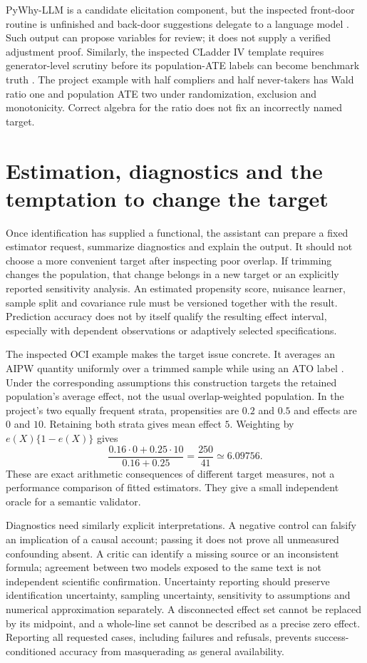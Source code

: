 PyWhy-LLM is a candidate elicitation component, but the inspected front-door
routine is unfinished and back-door suggestions delegate to a language model
\cite{v12_la_package_pywhy_llm}. Such output can propose variables for review; it
does not supply a verified adjustment proof. Similarly, the inspected CLadder
IV template requires generator-level scrutiny before its population-ATE labels
can become benchmark truth \cite{v12_la_package_cladder}. The project example
with half compliers and half never-takers has Wald ratio one and population ATE
two under randomization, exclusion and monotonicity. Correct algebra for the
ratio does not fix an incorrectly named target.

\section{Estimation, diagnostics and the temptation to change the target}

Once identification has supplied a functional, the assistant can prepare a fixed
estimator request, summarize diagnostics and explain the output. It should not
choose a more convenient target after inspecting poor overlap. If trimming
changes the population, that change belongs in a new target or an explicitly
reported sensitivity analysis. An estimated propensity score, nuisance learner,
sample split and covariance rule must be versioned together with the result.
Prediction accuracy does not by itself qualify the resulting effect interval,
especially with dependent observations or adaptively selected specifications.

The inspected OCI example makes the target issue concrete. It averages an AIPW
quantity uniformly over a trimmed sample while using an ATO label
\cite{v12_la_package_oci_agent}. Under the corresponding assumptions this
construction targets the retained population's average effect, not the usual
overlap-weighted population. In the project's two equally frequent strata,
propensities are $0.2$ and $0.5$ and effects are $0$ and $10$. Retaining both
strata gives mean effect $5$. Weighting by $e(X)\{1-e(X)\}$ gives
\[
 \frac{0.16\cdot0+0.25\cdot10}{0.16+0.25}
 =\frac{250}{41}\simeq6.09756.
\]
These are exact arithmetic consequences of different target measures, not a
performance comparison of fitted estimators. They give a small independent
oracle for a semantic validator.

Diagnostics need similarly explicit interpretations. A negative control can
falsify an implication of a causal account; passing it does not prove all
unmeasured confounding absent. A critic can identify a missing source or an
inconsistent formula; agreement between two models exposed to the same text is
not independent scientific confirmation. Uncertainty reporting should preserve
identification uncertainty, sampling uncertainty, sensitivity to assumptions
and numerical approximation separately. A disconnected effect set cannot be
replaced by its midpoint, and a whole-line set cannot be described as a precise
zero effect. Reporting all requested cases, including failures and refusals,
prevents success-conditioned accuracy from masquerading as general availability.

